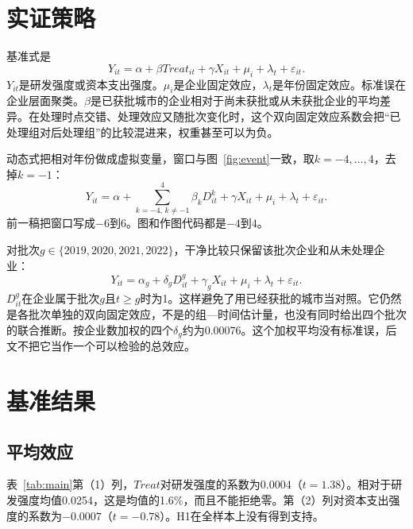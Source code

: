 \documentclass[12pt,hyperref,a4paper,UTF8]{ctexart}
\begin{document}
\section{实证策略}

基准式是
\begin{equation}
Y_{it}=\alpha+\beta Treat_{it}+\gamma X_{it}+\mu_i+\lambda_t+\varepsilon_{it}.
\label{eq:main}
\end{equation}
$Y_{it}$是研发强度或资本支出强度。$\mu_i$是企业固定效应，$\lambda_t$是年份固定效应。标准误在企业层面聚类。$\beta$是已获批城市的企业相对于尚未获批或从未获批企业的平均差异。在处理时点交错、处理效应又随批次变化时，这个双向固定效应系数会把“已处理组对后处理组”的比较混进来，权重甚至可以为负\parencite{goodman2021difference,dechaisemartin2020twoway}。

动态式把相对年份做成虚拟变量，窗口与图~\ref{fig:event}一致，取$k=-4,\ldots,4$，去掉$k=-1$：
\begin{equation}
Y_{it}=\alpha+\sum_{k=-4,\,k\neq -1}^{4}\beta_k D_{it}^{k}+\gamma X_{it}+\mu_i+\lambda_t+\varepsilon_{it}.
\label{eq:event}
\end{equation}
前一稿把窗口写成$-6$到$6$。图和作图代码都是$-4$到$4$。

对批次$g\in\{2019,2020,2021,2022\}$，干净比较只保留该批次企业和从未处理企业：
\begin{equation}
Y_{it}=\alpha_g+\delta_g D_{it}^{g}+\gamma_g X_{it}+\mu_i+\lambda_t+\varepsilon_{it}.
\label{eq:cohort}
\end{equation}
$D_{it}^{g}$在企业属于批次$g$且$t\ge g$时为1。这样避免了用已经获批的城市当对照。它仍然是各批次单独的双向固定效应，不是\textcite{callaway2021difference}的组—时间估计量，也没有同时给出四个批次的联合推断。按企业数加权的四个$\delta_g$约为0.00076。这个加权平均没有标准误，后文不把它当作一个可以检验的总效应。

\section{基准结果}

\subsection{平均效应}

表~\ref{tab:main}第（1）列，$Treat$对研发强度的系数为0.0004（$t=1.38$）。相对于研发强度均值0.0254，这是均值的1.6\%，而且不能拒绝零。第（2）列对资本支出强度的系数为$-0.0007$（$t=-0.78$）。H1在全样本上没有得到支持。
\end{document}
